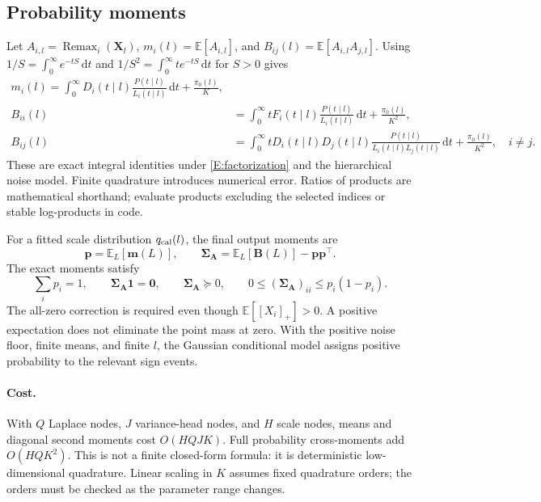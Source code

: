 \documentclass[letterpaper]{article}
\newcommand{\E}{\mathbb E}
\newcommand{\Remax}{\operatorname{Remax}}
\newcommand{\dd}{\,\mathrm d}
\newcommand{\given}{\mid}
\begin{document}
\subsection{Probability moments}
Let $A_{i,l}=\Remax_i(\bm X_l)$, $m_i(l)=\E[A_{i,l}]$, and $B_{ij}(l)=\E[A_{i,l}A_{j,l}]$. Using $1/S=\int_0^\infty e^{-tS}\dd t$ and $1/S^2=\int_0^\infty t e^{-tS}\dd t$ for $S>0$ gives
\begin{align}
\boxed{m_i(l)=\int_0^\infty D_i(t\given l)\frac{P(t\given l)}{L_i(t\given l)}\dd t+\frac{\pi_0(l)}K,}\label{E:pmean}\\
B_{ii}(l)&=\int_0^\infty tF_i(t\given l)\frac{P(t\given l)}{L_i(t\given l)}\dd t+\frac{\pi_0(l)}{K^2},\label{E:psecond}\\
B_{ij}(l)&=\int_0^\infty tD_i(t\given l)D_j(t\given l)
\frac{P(t\given l)}{L_i(t\given l)L_j(t\given l)}\dd t+\frac{\pi_0(l)}{K^2},\quad i\ne j.
\label{E:pcross}
\end{align}
These are exact integral identities under \eqref{E:factorization} and the hierarchical noise model. Finite quadrature introduces numerical error. Ratios of products are mathematical shorthand; evaluate products excluding the selected indices or stable log-products in code.

For a fitted scale distribution $q_{\rm cal}(l)$, the final output moments are
\begin{equation}
\bm p=\E_L[\bm m(L)],\qquad
\bm\Sigma_{\bm A}=\E_L[\bm B(L)]-\bm p\bm p^\intercal.
\label{E:finalmoments}
\end{equation}
The exact moments satisfy
\begin{equation}
\sum_ip_i=1,\qquad \bm\Sigma_{\bm A}\bm 1=\bm 0,\qquad
\bm\Sigma_{\bm A}\succeq0,\qquad 0\le(\bm\Sigma_{\bm A})_{ii}\le p_i(1-p_i).
\label{E:simplexchecks}
\end{equation}
The all-zero correction is required even though $\E[[X_i]_+]>0$. A positive expectation does not eliminate the point mass at zero. With the positive noise floor, finite means, and finite $l$, the Gaussian conditional model assigns positive probability to the relevant sign events.

\paragraph{Cost.}
With $Q$ Laplace nodes, $J$ variance-head nodes, and $H$ scale nodes, means and diagonal second moments cost $O(HQJK)$. Full probability cross-moments add $O(HQK^2)$. This is not a finite closed-form formula: it is deterministic low-dimensional quadrature. Linear scaling in $K$ assumes fixed quadrature orders; the orders must be checked as the parameter range changes.
\end{document}
